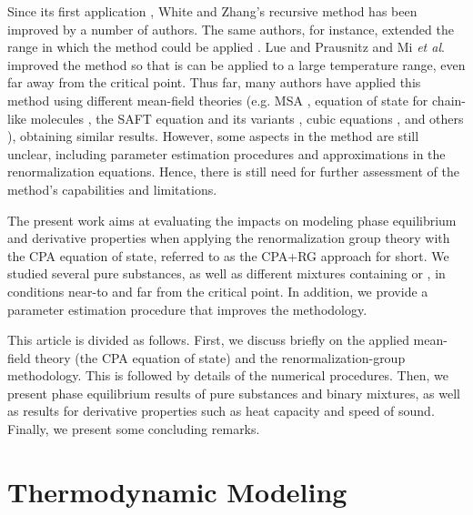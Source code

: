 \documentclass[preprint,12pt,3p]{elsarticle}
\begin{document}
Since its first application \citep{white1993renormalization}, White and Zhang’s recursive method has been improved by a number of authors.
The same authors, for instance, extended the range in which the method could be applied \cite{white1998renormalization}.
Lue and Prausnitz \cite{lue1998renormalization, lue1998brenormalization} and Mi \textit{et al}. \cite{mi2004improved} improved the method so that is can be applied to a large temperature range, even far away from the critical point.
Thus far, many authors have applied this method using different mean-field theories (e.g.
MSA \citep{lue1998renormalization}, equation of state for chain-like molecules \cite{jiang1999equation, jiang2000phase}, the SAFT equation and its variants \cite{llovell2004thermodynamic, forte2011application, bymaster2008renormalization, tang2010renormalization, llovell2006global, forte2013application, dias2009thermodynamic, llovell2006second, llovell2006prediction, llovell2007phase}, cubic equations \cite{xu2011prediction,xu2010crossover,pcm2017application,llovell2008accurate,qiu2006vapor,cai2006vapor,cai2004thermodynamics}, and others \cite{ghobadi2013renormalization,choi2016renormalization}), obtaining similar results.
However, some aspects in the method are still unclear, including parameter estimation procedures and approximations in the renormalization equations.
Hence, there is still need for further assessment of the method's capabilities and limitations.

The present work aims at evaluating the impacts on modeling phase equilibrium and derivative properties when applying the renormalization group theory with the CPA equation of state, referred to as the CPA+RG approach for short.
We studied several pure substances, as well as different mixtures containing  or , in conditions near-to and far from the critical point.
In addition, we provide a parameter estimation procedure that improves the methodology.

This article is divided as follows.
First, we discuss briefly on the applied mean-field theory (the CPA equation of state) and the renormalization-group methodology.
This is followed by details of the numerical procedures.
Then, we present phase equilibrium results of pure substances and binary mixtures, as well as results for derivative properties such as heat capacity and speed of sound.
Finally, we present some concluding remarks.

\section{Thermodynamic Modeling}
\end{document}
